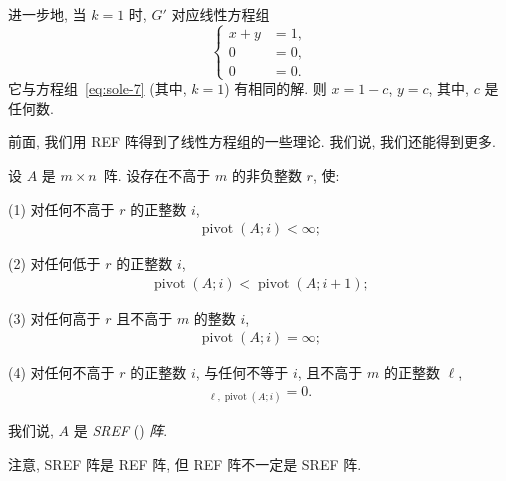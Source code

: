 \documentclass[../libro.tex]{subfiles}
\begin{document}
\begin{example}
    进一步地, 当 \(k = 1\) 时, \(G'\) 对应线性方程组
    \begin{equation*}
        \left\{ %
        \begin{aligned}
            x + y & = 1, \\
            0     & = 0, \\
            0     & = 0.
        \end{aligned}
        \right. %
    \end{equation*}
    它与方程组~\eqref{eq:sole-7}
    (其中, \(k = 1\)) 有相同的解.
    则 \(x = 1 - c\), \(y = c\),
    其中, \(c\) 是任何数.
\end{example}

前面, 我们用 REF 阵得到了线性方程组的一些理论.
我们说, 我们还能得到更多.

\begin{definition}
    设 \(A\) 是 \(m \times n\)~阵.
    设存在不高于 \(m\) 的非负整数 \(r\), 使:

    (1)
    对任何不高于 \(r\) 的正整数 \(i\),
    \begin{align*}
        \operatorname{pivot} {(A; i)} < \infty;
    \end{align*}

    (2)
    对任何低于 \(r\) 的正整数 \(i\),
    \begin{align*}
        \operatorname{pivot} {(A; i)}
        < \operatorname{pivot} {(A; i + 1)};
    \end{align*}

    (3)
    对任何高于 \(r\) 且不高于 \(m\) 的整数 \(i\),
    \begin{align*}
        \operatorname{pivot} {(A; i)} = \infty;
    \end{align*}

    (4)
    对任何不高于 \(r\) 的正整数 \(i\),
    与任何不等于 \(i\),
    且不高于 \(m\) 的正整数 \(\ell\),
    \begin{align*}
        [A]_{\ell,\operatorname{pivot} {(A; i)}} = 0.
    \end{align*}

    我们说, \(A\) 是 \emph{SREF}
    () \emph{阵}.
\end{definition}

注意, SREF 阵是 REF 阵,
但 REF 阵不一定是 SREF 阵.
\end{document}
